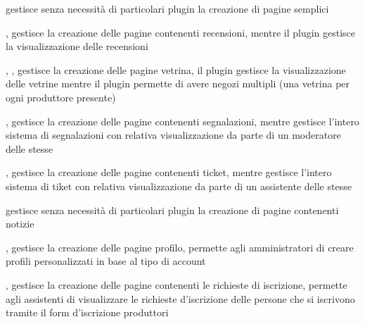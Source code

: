 {}
{ gestisce senza necessità di particolari plugin la creazione di pagine semplici}


{, }
{ gestisce la creazione delle pagine contenenti recensioni, mentre il plugin  gestisce la visualizzazione delle recensioni}


{, , }
{ gestisce la creazione delle pagine vetrina, il plugin  gestisce la visualizzazione delle vetrine mentre il plugin  permette di avere negozi multipli (una vetrina per ogni produttore presente)}


{, }
{ gestisce la creazione delle pagine contenenti segnalazioni, mentre  gestisce l'intero sistema di segnalazioni con relativa visualizzazione da parte di un moderatore delle stesse}


{, }
{ gestisce la creazione delle pagine contenenti ticket, mentre  gestisce l'intero sistema di tiket con relativa visualizzazione da parte di un assistente delle stesse}


{}
{ gestisce senza necessità di particolari plugin la creazione di pagine contenenti notizie}


{, }
{ gestisce la creazione delle pagine profilo,  permette agli amministratori di creare profili personalizzati in base al tipo di account}


{, }
{ gestisce la creazione delle pagine contenenti le richieste di iscrizione,  permette agli assistenti di visualizzare le richieste d'iscrizione delle persone che si iscrivono tramite il form d'iscrizione produttori}

